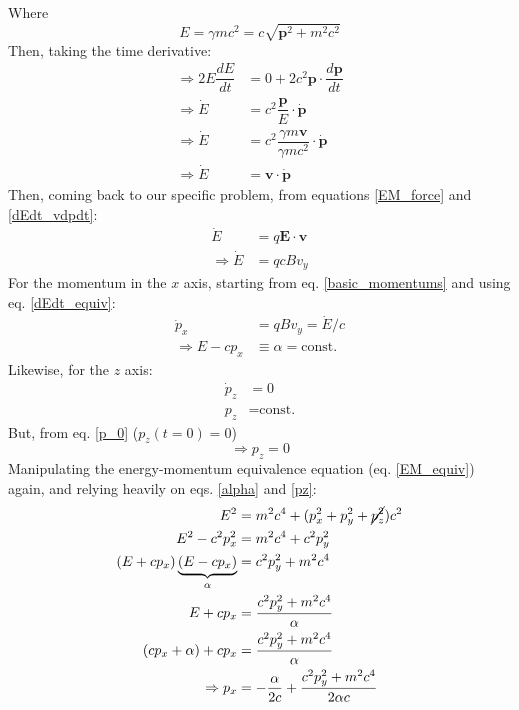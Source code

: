 \documentclass[]{article}
\numberwithin{equation}{section}
\newcommand{\0}{\textcolor{gray}{0}}
\begin{document}
Where
\begin{equation}
	E = \gamma m c^2 = c\sqrt{\mathbf{p}^2 + m^2c^2}
\end{equation}
Then, taking the time derivative: 
\begin{align}
	\Rightarrow 2E\dfrac{dE}{dt} &= 0 + 2c^2\mathbf{p}\cdot\dfrac{d\mathbf{p}}{dt}\nonumber\\
	\Rightarrow\dot{E} &= c^2\dfrac{\mathbf{p}}{E}\cdot\dot{\mathbf{p}}\nonumber\\
	\Rightarrow\dot{E} &= c^2\dfrac{\gamma m\mathbf{v}}{\gamma m c^2}\cdot\dot{\mathbf{p}}\nonumber\\
	\Rightarrow\dot{E} &= \mathbf{v}\cdot\dot{\mathbf{p}}\label{dEdt_vdpdt}
\end{align}
Then, coming back to our specific problem, from equations \ref{EM_force} and \ref{dEdt_vdpdt}:
\begin{align}
	\dot{E} &= q\mathbf{E}\cdot\mathbf{v}\nonumber\\
	\Rightarrow\dot{E} &= q c B v_y\label{dEdt_equiv}
\end{align}
For the momentum in the \(x\) axis, starting from eq. \ref{basic_momentums} and using eq. \ref{dEdt_equiv}:
\begin{align}
	\dot{p}_x &= q B v_y = \dot{E}/c\nonumber\\
	\Rightarrow  E - cp_x &\equiv \alpha = \text{const.}\label{alpha}
\end{align}
Likewise, for the \(z\) axis:
\begin{align*}
	\dot{p}_z &= 0\\
	p_z &= \text{const.}
\end{align*}
But, from eq. \ref{p_0} (\(p_z(t=0) = 0\))
\begin{equation}
	\Rightarrow p_z = 0\label{pz}
\end{equation}
Manipulating the energy-momentum equivalence equation (eq. \ref{EM_equiv}) again, and relying heavily on eqs. \ref{alpha} and \ref{pz}:
\begin{align}
	E^2 &= m^2c^4 + (p_x^2 + p_y^2 + \cancel{p_z^2})c^2\nonumber\\
	E^2 - c^2p_x^2 &= m^2c^4 + c^2p_y^2\nonumber\\
	(E + cp_x)\underbrace{(E - cp_x)}_{\alpha} &= c^2p_y^2 + m^2c^4\nonumber\\
	E + cp_x &= \frac{c^2p_y^2 + m^2c^4}{\alpha}\nonumber\\
	(cp_x + \alpha) + cp_x &= \frac{c^2p_y^2 + m^2c^4}{\alpha}\nonumber\\
	\Rightarrow p_x &= - \frac{\alpha}{2c} + \frac{c^2p_y^2 + m^2c^4}{2\alpha c}\label{px}
\end{align}
\end{document}
